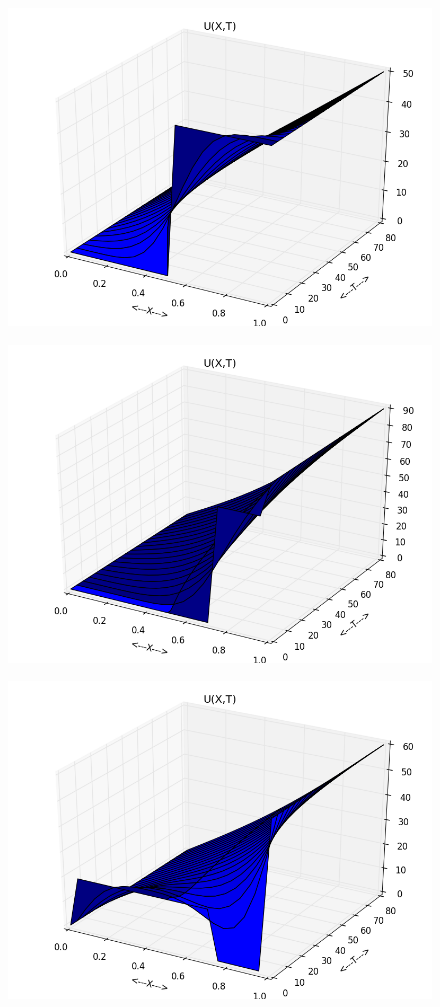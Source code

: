 \documentclass[letterpaper, 11 pt, conference]{ieeeconf}
\begin{document}
\begin{figure}
\includegraphics[scale=0.35]{plot_test_original_pwl_1.png}
\end{figure}
\begin{figure}
\includegraphics[scale=0.35]{plot_test_original_pwl_2.png}
\end{figure}
\begin{figure}
\includegraphics[scale=0.35]{plot_test_original_pwl_3.png}
\end{figure}
\end{document}
